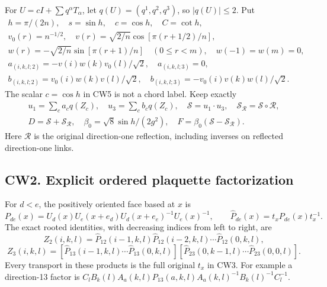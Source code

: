 \documentclass[11pt]{article}
\begin{document}
For \(U=cI+\sum q^\alpha T_\alpha\), let
\(q(U)=(q^1,q^2,q^3)\), so \(|q(U)|\le2\). Put
\[
 \begin{gathered}
 h=\pi/(2n),\quad s=\sin h,\quad c=\cos h,\quad C=\cot h,\\
 v_0(r)=n^{-1/2},\quad v(r)=\sqrt{2/n}\cos[\pi(r+1/2)/n],\\
 w(r)=-\sqrt{2/n}\sin[\pi(r+1)/n]\quad(0\le r<m),
 \quad w(-1)=w(m)=0,\\
 a_{(i,k,l;2)}=-v(i)w(k)v_0(l)/\sqrt2,\quad a_{(i,k,l;3)}=0,\\
 b_{(i,k,l;2)}=v_0(i)w(k)v(l)/\sqrt2,\quad
 b_{(i,k,l;3)}=-v_0(i)v(k)w(l)/\sqrt2.
 \end{gathered}                                                \tag{CW5}
\]
The scalar \(c=\cos h\) in CW5 is not a chord label. Keep exactly
\[
 \begin{gathered}
 u_1=\sum_c a_cq(Z_c),\quad u_3=\sum_c b_cq(Z_c),\quad
 \mathcal S=u_1\cdot u_3,\quad
 \mathcal S_{\mathcal R}=\mathcal S\circ\mathcal R,\\
 D=\mathcal S+\mathcal S_{\mathcal R},\quad
 \beta_0=\sqrt8\sin h/(2g^2),\quad
 F=\beta_0(\mathcal S-\mathcal S_{\mathcal R}).
 \end{gathered}                                                \tag{CW6}
\]
Here \(\mathcal R\) is the original direction-one reflection,
including inverses on reflected direction-one links.

\subsection*{CW2. Explicit ordered plaquette factorization}

For \(d<e\), the positively oriented face based at \(x\) is
\[
 P_{de}(x)=U_d(x)U_e(x+e_d)U_d(x+e_e)^{-1}U_e(x)^{-1},
 \qquad \widehat P_{de}(x)=t_xP_{de}(x)t_x^{-1}.             \tag{CW7}
\]
The exact rooted identities, with decreasing indices from left
to right, are
\[
 \boxed{Z_2(i,k,l)=
 \widehat P_{12}(i-1,k,l)\widehat P_{12}(i-2,k,l)
       \cdots\widehat P_{12}(0,k,l),}                        \tag{CW8}
\]
\[
 \boxed{Z_3(i,k,l)=
 [\widehat P_{13}(i-1,k,l)\cdots\widehat P_{13}(0,k,l)]
 [\widehat P_{23}(0,k-1,l)\cdots\widehat P_{23}(0,0,l)].}  \tag{CW9}
\]
Every transport in these products is the full original \(t_x\)
in CW3. For example a direction-13 factor is
\(C_lB_k(l)A_a(k,l)P_{13}(a,k,l)
A_a(k,l)^{-1}B_k(l)^{-1}C_l^{-1}\).
\end{document}
